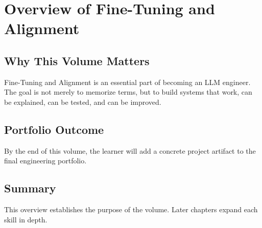 
\chapter{Overview of Fine-Tuning and Alignment}
\label{chap:volume13-overview}



\section{Why This Volume Matters}

Fine-Tuning and Alignment is an essential part of becoming an LLM engineer. The goal is not merely to memorize terms, but to build systems that work, can be explained, can be tested, and can be improved.

\section{Portfolio Outcome}

By the end of this volume, the learner will add a concrete project artifact to the final engineering portfolio.

\section{Summary}

This overview establishes the purpose of the volume. Later chapters expand each skill in depth.
